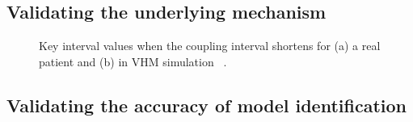 \documentclass[openany]{now} %
\begin{document}
\subsection{Validating the underlying mechanism}


\begin{figure}[!t]
\centering
\label{fig:Case_1}
\caption{\small Key interval values when the coupling interval shortens for (a) a real patient and (b) in VHM simulation ~\cite{vhm_ecrts10}.}
\end{figure} 

\subsection{Validating the accuracy of model identification}

\end{document}
